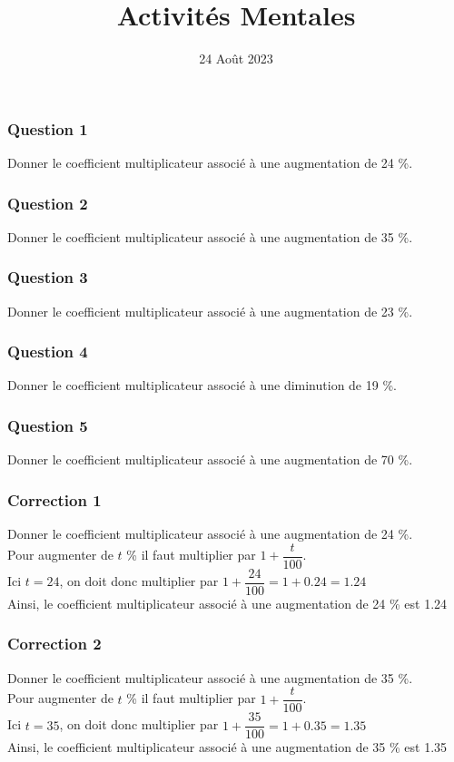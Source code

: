 \documentclass[15pt, mathserif]{beamer}
\title{Activités Mentales}
\date{24 Août 2023}
\begin{document}
\begin{frame}
    \titlepage
\end{frame}

\begin{frame} 
	\frametitle{Question 1}
Donner le coefficient multiplicateur associé à une augmentation de 24 \%.\end{frame}


\begin{frame} 
	\frametitle{Question 2}
Donner le coefficient multiplicateur associé à une augmentation de 35 \%.\end{frame}


\begin{frame} 
	\frametitle{Question 3}
Donner le coefficient multiplicateur associé à une augmentation de 23 \%.\end{frame}


\begin{frame} 
	\frametitle{Question 4}
Donner le coefficient multiplicateur associé à une diminution de 19 \%.\end{frame}


\begin{frame} 
	\frametitle{Question 5}
Donner le coefficient multiplicateur associé à une augmentation de 70 \%.\end{frame}


\begin{frame}
\vspace{-10mm}
	\frametitle{Correction 1}
Donner le coefficient multiplicateur associé à une augmentation de 24 \%. \\ \bigskip 
 Pour augmenter de $t$ \%  il faut multiplier par $1+\dfrac{t}{100}$. \\ \bigskip Ici $t=24$, on doit donc multiplier par  $1+\dfrac{24}{100}=1+0.24=1.24$ \\ \bigskip Ainsi, le coefficient multiplicateur associé à une augmentation de 24 \% est 1.24\end{frame}


\begin{frame}
\vspace{-10mm}
	\frametitle{Correction 2}
Donner le coefficient multiplicateur associé à une augmentation de 35 \%. \\ \bigskip 
 Pour augmenter de $t$ \%  il faut multiplier par $1+\dfrac{t}{100}$. \\ \bigskip Ici $t=35$, on doit donc multiplier par  $1+\dfrac{35}{100}=1+0.35=1.35$ \\ \bigskip Ainsi, le coefficient multiplicateur associé à une augmentation de 35 \% est 1.35\end{frame}
\end{document}
